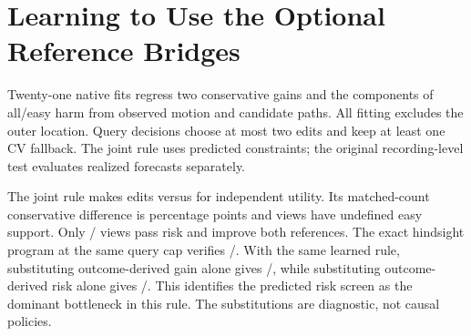 \section{Learning to Use the Optional Reference Bridges}
Twenty-one native fits regress two conservative gains and the
components of all/easy harm from observed motion and candidate paths.
All fitting excludes the outer location. Query decisions choose at
most two edits and keep at least one CV fallback. The joint rule uses
predicted constraints; the original recording-level test evaluates
realized forecasts separately.

The joint rule makes \CausalBridgeEdits{} edits versus
\CausalBridgeIndependent{} for independent utility. Its matched-count
conservative difference is \CausalBridgeDirect{} percentage points
and \CausalBridgeUndefined{} views have undefined easy support.
Only \CausalBridgePass/\CausalBridgeViews{} views pass risk and improve
both references. The exact hindsight program at the same query cap
verifies \CausalBridgeOracle/\CausalBridgeViews{}. With the same
learned rule, substituting outcome-derived gain alone gives
\CausalBridgeGain/\CausalBridgeViews{}, while substituting
outcome-derived risk alone gives \CausalBridgeRisk/\CausalBridgeViews{}.
This identifies the predicted risk screen as the dominant bottleneck
in this rule. The substitutions are diagnostic, not causal policies.
